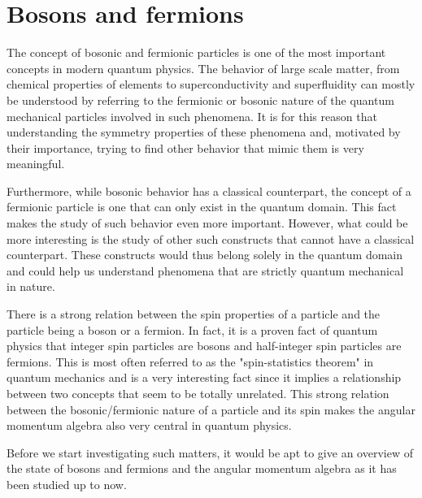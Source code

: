 \section{Bosons and fermions}
The concept of bosonic and fermionic particles is one of the most important concepts
in modern quantum physics. The behavior of large scale matter, from chemical
properties of elements to superconductivity and superfluidity can mostly be
understood by referring to the fermionic or bosonic nature of the quantum
mechanical particles involved in such phenomena. It is for this reason that
understanding the symmetry properties of these phenomena and, motivated by their
importance, trying to find other behavior that mimic them is very meaningful.

Furthermore, while bosonic behavior has a classical counterpart, the
concept of a fermionic particle is one that can only exist in the quantum
domain. This fact makes the study of such behavior even more important.
However, what could be more interesting is the study of other such
constructs that cannot have a classical counterpart. These constructs would
thus belong solely in the quantum domain and could help us understand phenomena
that are strictly quantum mechanical in nature.

There is a strong relation between the spin properties of a particle and
the particle being a boson or a fermion. In fact, it is a proven fact of
quantum physics that integer spin particles are bosons and half-integer spin
particles are fermions. This is most often referred to as the "spin-statistics
theorem" in quantum mechanics and is a very interesting fact since it implies
a relationship between two concepts that seem to be totally unrelated. This
strong relation between the bosonic/fermionic nature of a particle and its spin
makes the angular momentum algebra also very central in quantum physics.

Before we start investigating such matters, it would be apt to give an
overview of the state of bosons and fermions and the angular momentum
algebra as it has been studied up to now.

